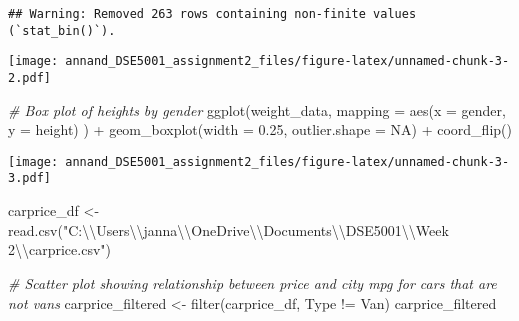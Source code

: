 \documentclass[
]{article}
\newenvironment{Shaded}{\begin{snugshade}}{\end{snugshade}}
\newcommand{\AttributeTok}[1]{\textcolor[rgb]{0.77,0.63,0.00}{#1}}
\newcommand{\CommentTok}[1]{\textcolor[rgb]{0.56,0.35,0.01}{\textit{#1}}}
\newcommand{\ConstantTok}[1]{\textcolor[rgb]{0.00,0.00,0.00}{#1}}
\newcommand{\FloatTok}[1]{\textcolor[rgb]{0.00,0.00,0.81}{#1}}
\newcommand{\FunctionTok}[1]{\textcolor[rgb]{0.00,0.00,0.00}{#1}}
\newcommand{\NormalTok}[1]{#1}
\newcommand{\OtherTok}[1]{\textcolor[rgb]{0.56,0.35,0.01}{#1}}
\newcommand{\SpecialCharTok}[1]{\textcolor[rgb]{0.00,0.00,0.00}{#1}}
\newcommand{\StringTok}[1]{\textcolor[rgb]{0.31,0.60,0.02}{#1}}
\begin{document}
\begin{verbatim}
## Warning: Removed 263 rows containing non-finite values (`stat_bin()`).
\end{verbatim}

\texttt{[image: annand\_DSE5001\_assignment2\_files/figure-latex/unnamed-chunk-3-2.pdf]}

\begin{Shaded}
\begin{Highlighting}[]
\CommentTok{\# Box plot of heights by gender}
\FunctionTok{ggplot}\NormalTok{(weight\_data,}
       \AttributeTok{mapping =} \FunctionTok{aes}\NormalTok{(}\AttributeTok{x =}\NormalTok{ gender, }\AttributeTok{y =}\NormalTok{ height)}
\NormalTok{) }\SpecialCharTok{+} \FunctionTok{geom\_boxplot}\NormalTok{(}\AttributeTok{width =} \FloatTok{0.25}\NormalTok{, }\AttributeTok{outlier.shape =} \ConstantTok{NA}\NormalTok{) }\SpecialCharTok{+} \FunctionTok{coord\_flip}\NormalTok{()}
\end{Highlighting}
\end{Shaded}

\texttt{[image: annand\_DSE5001\_assignment2\_files/figure-latex/unnamed-chunk-3-3.pdf]}

\begin{Shaded}
\begin{Highlighting}[]
\NormalTok{carprice\_df }\OtherTok{\textless{}{-}} \FunctionTok{read.csv}\NormalTok{(}\StringTok{"C:}\SpecialCharTok{\textbackslash{}\textbackslash{}}\StringTok{Users}\SpecialCharTok{\textbackslash{}\textbackslash{}}\StringTok{janna}\SpecialCharTok{\textbackslash{}\textbackslash{}}\StringTok{OneDrive}\SpecialCharTok{\textbackslash{}\textbackslash{}}\StringTok{Documents}\SpecialCharTok{\textbackslash{}\textbackslash{}}\StringTok{DSE5001}\SpecialCharTok{\textbackslash{}\textbackslash{}}\StringTok{Week 2}\SpecialCharTok{\textbackslash{}\textbackslash{}}\StringTok{carprice.csv"}\NormalTok{)}

\CommentTok{\# Scatter plot showing relationship between price and city mpg for cars that are not vans}
\NormalTok{carprice\_filtered }\OtherTok{\textless{}{-}} \FunctionTok{filter}\NormalTok{(carprice\_df, Type }\SpecialCharTok{!=} \StringTok{\textquotesingle{}Van\textquotesingle{}}\NormalTok{)}
\NormalTok{carprice\_filtered}
\end{Highlighting}
\end{Shaded}
\end{document}
